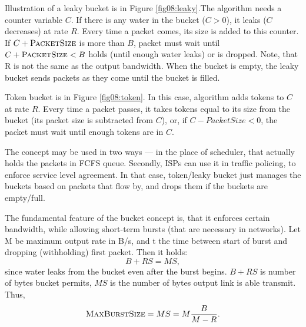 Illustration of a leaky bucket is in Figure \ref{fig08:leaky}.The algorithm needs a counter variable $C$. If there is any water in the bucket ($C > 0$), it leaks ($C$ decreases) at rate $R$. Every time a packet comes, its size is added to this counter. If $C + \textsc{PacketSize}$ is more than $B$, packet must wait until $C + \textsc{PacketSize} < B$ holds (until enough water leaks) or is dropped. Note, that R is not the same as the output bandwidth. When the bucket is empty, the leaky bucket sends packets as they come until the bucket is filled. 

Token bucket is in Figure \ref{fig08:token}. In this case, algorithm adds tokens to $C$ at rate $R$. Every time a packet passes, it takes tokens equal to its size from the bucket (its packet size is subtracted from $C$), or, if $C - PacketSize < 0$, the packet must wait until enough tokens are in $C$. 

The concept may be used in two ways --- in the place of scheduler, that actually holds the packets in FCFS queue. Secondly, ISPs can use it in traffic policing, to enforce service level agreement. In that case, token/leaky bucket just manages the buckets based on packets that flow by, and drops them if the buckets are empty/full.

The fundamental feature of the bucket concept is, that it enforces certain bandwidth, while allowing short-term bursts (that are necessary in networks). Let M be maximum output rate in B/s, and t the time between start of burst and dropping (withholding) first packet. Then it holds:
\[
	B + RS = MS,
\]
since water leaks from the bucket even after the burst begins. $B + RS$ is number of bytes bucket permits, $MS$ is the number of bytes output link is able transmit. Thus,
\[
	\textsc{MaxBurstSize} = MS = M\frac{B}{M - R}.
\]

